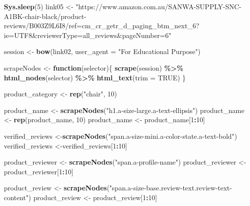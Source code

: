 \documentclass[
]{article}
\newenvironment{Shaded}{\begin{snugshade}}{\end{snugshade}}
\newcommand{\AttributeTok}[1]{\textcolor[rgb]{0.13,0.29,0.53}{#1}}
\newcommand{\ConstantTok}[1]{\textcolor[rgb]{0.56,0.35,0.01}{#1}}
\newcommand{\ControlFlowTok}[1]{\textcolor[rgb]{0.13,0.29,0.53}{\textbf{#1}}}
\newcommand{\DecValTok}[1]{\textcolor[rgb]{0.00,0.00,0.81}{#1}}
\newcommand{\FunctionTok}[1]{\textcolor[rgb]{0.13,0.29,0.53}{\textbf{#1}}}
\newcommand{\NormalTok}[1]{#1}
\newcommand{\OtherTok}[1]{\textcolor[rgb]{0.56,0.35,0.01}{#1}}
\newcommand{\SpecialCharTok}[1]{\textcolor[rgb]{0.81,0.36,0.00}{\textbf{#1}}}
\newcommand{\StringTok}[1]{\textcolor[rgb]{0.31,0.60,0.02}{#1}}
\begin{document}
\begin{Shaded}
\begin{Highlighting}[]
  \FunctionTok{Sys.sleep}\NormalTok{(}\DecValTok{5}\NormalTok{)}
\NormalTok{link05 }\OtherTok{\textless{}{-}} \StringTok{"https://www.amazon.com.au/SANWA{-}SUPPLY{-}SNC{-}A1BK{-}chair{-}black/product{-}reviews/B003Z9L6I8/ref=cm\_cr\_getr\_d\_paging\_btm\_next\_6?ie=UTF8\&reviewerType=all\_reviews\&pageNumber=6"}


\NormalTok{  session }\OtherTok{\textless{}{-}} \FunctionTok{bow}\NormalTok{(link02,}
               \AttributeTok{user\_agent =} \StringTok{"For Educational Purpose"}\NormalTok{)}

\NormalTok{  scrapeNodes }\OtherTok{\textless{}{-}} \ControlFlowTok{function}\NormalTok{(selector)\{}
    \FunctionTok{scrape}\NormalTok{(session) }\SpecialCharTok{\%\textgreater{}\%}
      \FunctionTok{html\_nodes}\NormalTok{(selector) }\SpecialCharTok{\%\textgreater{}\%}
      \FunctionTok{html\_text}\NormalTok{(}\AttributeTok{trim =} \ConstantTok{TRUE}\NormalTok{)}
\NormalTok{  \}}

\NormalTok{  product\_category }\OtherTok{\textless{}{-}} \FunctionTok{rep}\NormalTok{(}\StringTok{"chair"}\NormalTok{, }\DecValTok{10}\NormalTok{)}

\NormalTok{  product\_name }\OtherTok{\textless{}{-}} \FunctionTok{scrapeNodes}\NormalTok{(}\StringTok{"h1.a{-}size{-}large.a{-}text{-}ellipsis"}\NormalTok{)}
\NormalTok{  product\_name }\OtherTok{\textless{}{-}} \FunctionTok{rep}\NormalTok{(product\_name, }\DecValTok{10}\NormalTok{)}
\NormalTok{  product\_name }\OtherTok{\textless{}{-}}\NormalTok{ product\_name[}\DecValTok{1}\SpecialCharTok{:}\DecValTok{10}\NormalTok{]}
  
\NormalTok{  verified\_reviews }\OtherTok{\textless{}{-}}\FunctionTok{scrapeNodes}\NormalTok{(}\StringTok{"span.a{-}size{-}mini.a{-}color{-}state.a{-}text{-}bold"}\NormalTok{)}
\NormalTok{  verified\_reviews }\OtherTok{\textless{}{-}}\NormalTok{verified\_reviews[}\DecValTok{1}\SpecialCharTok{:}\DecValTok{10}\NormalTok{]}
  
\NormalTok{  product\_reviewer }\OtherTok{\textless{}{-}} \FunctionTok{scrapeNodes}\NormalTok{(}\StringTok{"span.a{-}profile{-}name"}\NormalTok{)}
\NormalTok{  product\_reviewer }\OtherTok{\textless{}{-}}\NormalTok{ product\_reviewer[}\DecValTok{1}\SpecialCharTok{:}\DecValTok{10}\NormalTok{]}
  
\NormalTok{  product\_review }\OtherTok{\textless{}{-}} \FunctionTok{scrapeNodes}\NormalTok{(}\StringTok{"span.a{-}size{-}base.review{-}text.review{-}text{-}content"}\NormalTok{)}
\NormalTok{  product\_review }\OtherTok{\textless{}{-}}\NormalTok{ product\_review[}\DecValTok{1}\SpecialCharTok{:}\DecValTok{10}\NormalTok{]}
  

\end{Highlighting}
\end{Shaded}
\end{document}
